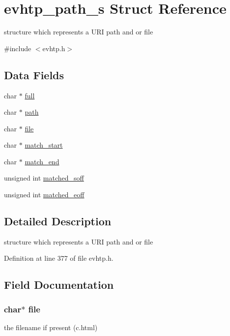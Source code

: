 \hypertarget{structevhtp__path__s}{\section{evhtp\-\_\-path\-\_\-s \-Struct \-Reference}
\label{structevhtp__path__s}
}


structure which represents a \-U\-R\-I path and or file  




{\ttfamily \#include $<$evhtp.\-h$>$}

\subsection*{\-Data \-Fields}
\begin{DoxyCompactItemize}
\item 
char $\ast$ \hyperlink{structevhtp__path__s_a3deff62337b4ec745307f4410d7ff6ce}{full}
\item 
char $\ast$ \hyperlink{structevhtp__path__s_a44196e6a5696d10442c29e639437196e}{path}
\item 
char $\ast$ \hyperlink{structevhtp__path__s_adf16cd437526a5c5e0e0af87745acbb8}{file}
\item 
char $\ast$ \hyperlink{structevhtp__path__s_a25d9dc60fbb26e1c4898184e1e46e9ab}{match\-\_\-start}
\item 
char $\ast$ \hyperlink{structevhtp__path__s_aa1f13c993b57860b101d02bc62bb801b}{match\-\_\-end}
\item 
unsigned int \hyperlink{structevhtp__path__s_af11f4fc41ab5561c5d430cedfa5e53d8}{matched\-\_\-soff}
\item 
unsigned int \hyperlink{structevhtp__path__s_ae9fc73e1697747df74873f20d91db690}{matched\-\_\-eoff}
\end{DoxyCompactItemize}


\subsection{\-Detailed \-Description}
structure which represents a \-U\-R\-I path and or file 

\-Definition at line 377 of file evhtp.\-h.



\subsection{\-Field \-Documentation}
\hypertarget{structevhtp__path__s_adf16cd437526a5c5e0e0af87745acbb8}{
\subsubsection[{file}]{\setlength{\rightskip}{0pt plus 5cm}char$\ast$ {\bf file}}}\label{structevhtp__path__s_adf16cd437526a5c5e0e0af87745acbb8}
the filename if present (c.\-html) 

